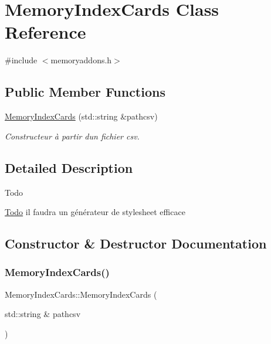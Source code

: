 \hypertarget{class_memory_index_cards}{}\section{Memory\+Index\+Cards Class Reference}
\label{class_memory_index_cards}


{\ttfamily \#include $<$memoryaddons.\+h$>$}

\subsection*{Public Member Functions}
\begin{DoxyCompactItemize}
\item 
\hyperlink{class_memory_index_cards_a10ae71958cd423edde68dc41dd010a66}{Memory\+Index\+Cards} (std\+::string \&pathcsv)
\begin{DoxyCompactList}\small\item\em Constructeur à partir d\textquotesingle{}un fichier csv. \end{DoxyCompactList}\end{DoxyCompactItemize}


\subsection{Detailed Description}
\begin{DoxyRefDesc}{Todo}
\item[\hyperlink{todo__todo000007}{Todo}]il faudra un générateur de stylesheet efficace \end{DoxyRefDesc}


\subsection{Constructor \& Destructor Documentation}
\mbox{\label{class_memory_index_cards_a10ae71958cd423edde68dc41dd010a66}} 
\subsubsection{\texorpdfstring{Memory\+Index\+Cards()}{MemoryIndexCards()}}
{\footnotesize\ttfamily Memory\+Index\+Cards\+::\+Memory\+Index\+Cards (\begin{DoxyParamCaption}\item[{std\+::string \&}]{pathcsv }\end{DoxyParamCaption})}



